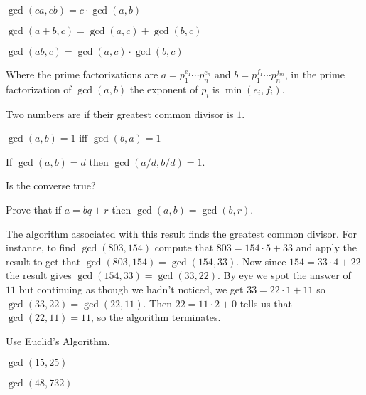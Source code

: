 \documentclass{ibl}
\begin{document}
\begin{ex}\pord
\begin{exes}
\item $\gcd(ca,cb)=c\cdot\gcd(a,b)$
\item $\gcd(a+b,c)=\gcd(a,c)+\gcd(b,c)$
\item $\gcd(ab,c)=\gcd(a,c)\cdot\gcd(b,c)$    
\end{exes}
\end{ex}

\begin{ex}
Where the prime factorizations are $a=p_1^{e_1}\cdots p_n^{e_n}$
and $b=p_1^{f_1}\cdots p_n^{f_m}$, in the prime factorization of
$\gcd(a,b)$ the exponent of $p_i$ is $\min(e_i,f_i)$.
\end{ex}

\begin{df}
Two numbers are  if their greatest common
divisor is $1$.  
\end{df}

\begin{ex}
\begin{exes}
\item $\gcd(a,b)=1$ iff $\gcd(b,a)=1$
\item If $\gcd(a,b)=d$ then $\gcd(a/d, b/d)=1$.
\item Is the converse true?    
\end{exes}
\end{ex}

\begin{ex}
Prove that if $a=bq+r$ then $\gcd(a,b)=\gcd(b,r)$.  
\end{ex}

The algorithm associated with this result finds the greatest common
divisor.  For instance, to find $\gcd(803,154)$ compute that
$803=154\cdot 5+33$ and apply the result to get that 
$\gcd(803,154)=\gcd(154,33)$.
Now since $154=33\cdot 4+22$ the result gives
$\gcd(154,33)=\gcd(33,22)$.
By eye we spot the answer of $11$ but continuing as though we hadn't noticed,
we get $33=22\cdot 1+11$ so $\gcd(33,22)=\gcd(22,11)$.
Then $22=11\cdot 2+0$ tells us that $\gcd(22,11)=11$, so the algorithm 
terminates.

\begin{ex}
Use Euclid's Algorithm.
\begin{exes}
\item $\gcd(15,25)$
\item $\gcd(48,732)$  
\end{exes}
\end{ex}
\end{document}
